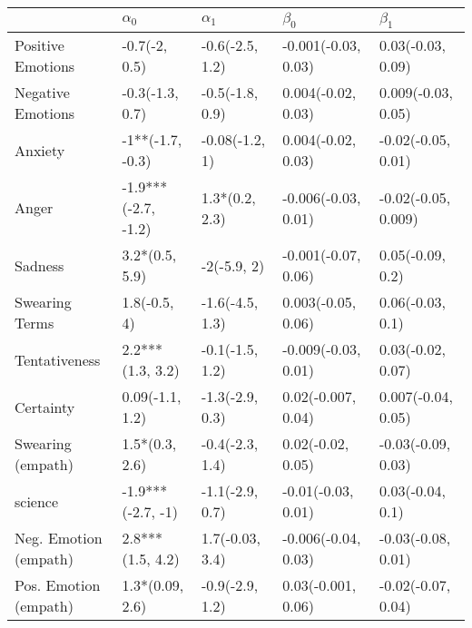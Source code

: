 \begin{tabular}{lllll}
\toprule
{} &           $\alpha_0$ &       $\alpha_1$ &            $\beta_0$ &            $\beta_1$ \\
\midrule
Positive Emotions     &        -0.7(-2, 0.5) &  -0.6(-2.5, 1.2) &  -0.001(-0.03, 0.03) &    0.03(-0.03, 0.09) \\
Negative Emotions     &      -0.3(-1.3, 0.7) &  -0.5(-1.8, 0.9) &   0.004(-0.02, 0.03) &   0.009(-0.03, 0.05) \\
Anxiety               &     -1**(-1.7, -0.3) &   -0.08(-1.2, 1) &   0.004(-0.02, 0.03) &   -0.02(-0.05, 0.01) \\
Anger                 &  -1.9***(-2.7, -1.2) &   1.3*(0.2, 2.3) &  -0.006(-0.03, 0.01) &  -0.02(-0.05, 0.009) \\
Sadness               &       3.2*(0.5, 5.9) &      -2(-5.9, 2) &  -0.001(-0.07, 0.06) &     0.05(-0.09, 0.2) \\
Swearing Terms        &         1.8(-0.5, 4) &  -1.6(-4.5, 1.3) &   0.003(-0.05, 0.06) &     0.06(-0.03, 0.1) \\
Tentativeness         &     2.2***(1.3, 3.2) &  -0.1(-1.5, 1.2) &  -0.009(-0.03, 0.01) &    0.03(-0.02, 0.07) \\
Certainty             &      0.09(-1.1, 1.2) &  -1.3(-2.9, 0.3) &   0.02(-0.007, 0.04) &   0.007(-0.04, 0.05) \\
Swearing (empath)     &       1.5*(0.3, 2.6) &  -0.4(-2.3, 1.4) &    0.02(-0.02, 0.05) &   -0.03(-0.09, 0.03) \\
science               &    -1.9***(-2.7, -1) &  -1.1(-2.9, 0.7) &   -0.01(-0.03, 0.01) &     0.03(-0.04, 0.1) \\
Neg. Emotion (empath) &     2.8***(1.5, 4.2) &  1.7(-0.03, 3.4) &  -0.006(-0.04, 0.03) &   -0.03(-0.08, 0.01) \\
Pos. Emotion (empath) &      1.3*(0.09, 2.6) &  -0.9(-2.9, 1.2) &   0.03(-0.001, 0.06) &   -0.02(-0.07, 0.04) \\
\bottomrule
\end{tabular}
